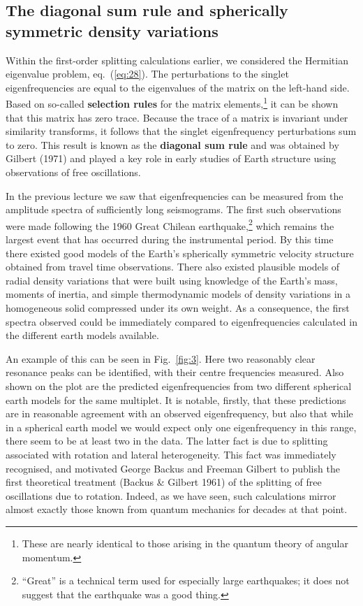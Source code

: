 \subsection*{The diagonal sum rule and spherically symmetric density variations}
Within the first-order splitting calculations earlier, we considered the Hermitian eigenvalue problem, eq.~(\ref{eq:28}). 
The perturbations to the singlet eigenfrequencies are equal to the eigenvalues of the matrix on the left-hand side. 
Based on so-called \textbf{selection rules} for the matrix elements,\footnote{These are nearly identical to those arising in the quantum theory
of angular momentum.} it can be shown that this matrix has zero trace. Because the trace of a matrix is invariant under
similarity transforms, it follows that the singlet eigenfrequency perturbations sum to zero. 
This result is known as the \textbf{diagonal sum rule} and was obtained by Gilbert (1971) and played a key role in early studies of
Earth structure using observations of free oscillations. 

In the previous lecture we saw that eigenfrequencies can be measured
from the amplitude spectra of sufficiently long seismograms. The first such observations were made following the 1960 Great Chilean earthquake,\footnote{``Great'' is a 
technical term used for especially large earthquakes; it does not suggest that the earthquake was a good thing.} which remains the largest event that has occurred during the instrumental period. By this time there existed good models 
of the Earth's spherically symmetric velocity structure obtained from travel time observations. There also existed plausible models 
of radial density variations that were built using knowledge of the Earth's mass, moments of inertia, and simple thermodynamic models of 
density variations in a homogeneous solid compressed under its own weight. As a consequence, the first spectra observed could be 
immediately compared to eigenfrequencies calculated in the different earth models available.

An example of this can be seen in Fig.~\ref{fig:3}. Here two reasonably clear resonance peaks can be identified, with their centre frequencies measured. 
Also shown on the plot are the predicted eigenfrequencies from two different spherical earth models for the same multiplet. It is notable, 
firstly, that these predictions are in reasonable agreement with an observed eigenfrequency, but also that while in a spherical earth 
model we would expect only one eigenfrequency in this range, there seem to be at least two in the data. The latter fact is due to 
splitting associated with rotation and lateral heterogeneity. This fact was immediately recognised, and motivated George Backus 
and Freeman Gilbert to publish the first theoretical treatment (Backus \& Gilbert 1961) of the splitting of free oscillations due to rotation. 
Indeed, as we have seen, such calculations mirror almost exactly those known from quantum mechanics for decades at that point.


